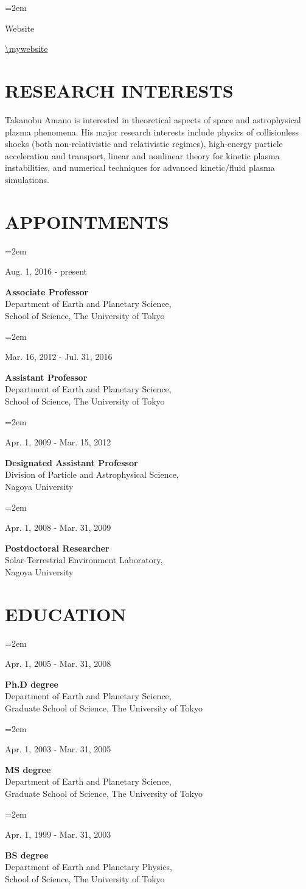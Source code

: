 \documentclass[lualatex,a4paper,ja=standard]{scrartcl}
\newcommand{\NewPart}[2]{\section*{\uppercase{#1} #2}}
\newcommand{\GeneralEntry}[4]{
\noindent\hangindent=2em\hangafter=0
\parbox{#1}{#3}
\hspace{1em}
\parbox{#2}{#4} \par
\vspace{0.5em}
}
\begin{document}
\GeneralEntry{8em}{32em}{Website}{\url{\mywebsite}}

\NewPart{Research Interests}{}
Takanobu Amano is interested in theoretical aspects of space and astrophysical plasma phenomena. His major research interests include physics of collisionless shocks (both non-relativistic and relativistic regimes), high-energy particle acceleration and transport, linear and nonlinear theory for kinetic plasma instabilities, and numerical techniques for advanced kinetic/fluid plasma simulations.

\clearpage

\NewPart{Appointments}{}

\GeneralEntry{14em}{28em}{Aug. 1, 2016 - present}
{\textbf{Associate Professor}\\
Department of Earth and Planetary Science,\\
School of Science, The University of Tokyo}

\GeneralEntry{14em}{28em}{Mar. 16, 2012 - Jul. 31, 2016}
{\textbf{Assistant Professor}\\
Department of Earth and Planetary Science,\\
School of Science, The University of Tokyo}

\GeneralEntry{14em}{28em}{Apr. 1, 2009 - Mar. 15, 2012}
{\textbf{Designated Assistant Professor}\\
Division of Particle and Astrophysical Science,\\
Nagoya University}

\GeneralEntry{14em}{28em}{Apr. 1, 2008 - Mar. 31, 2009}
{\textbf{Postdoctoral Researcher}\\
Solar-Terrestrial Environment Laboratory,\\
Nagoya University}


\NewPart{Education}{}

\GeneralEntry{14em}{28em}{Apr. 1, 2005 - Mar. 31, 2008}
{\textbf{Ph.D degree}\\
Department of Earth and Planetary Science,\\
Graduate School of Science, The University of Tokyo}

\GeneralEntry{14em}{28em}{Apr. 1, 2003 - Mar. 31, 2005}
{\textbf{MS degree}\\
Department of Earth and Planetary Science,\\
Graduate School of Science, The University of Tokyo}


\GeneralEntry{14em}{28em}{Apr. 1, 1999 - Mar. 31, 2003}
{\textbf{BS degree}\\
Department of Earth and Planetary Physics,\\
School of Science, The University of Tokyo}
\end{document}
